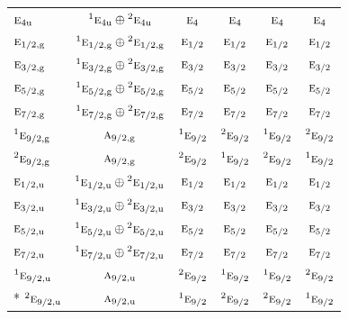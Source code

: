 \documentclass[10pt,a4paper]{article}
\numberwithin{equation}{section}
\newcommand{\irr}[1]{\text{\normalfont\scshape #1}}
\newcommand{\conjpair}[1]{{}^{#1}}
\newcommand{\ptag}[1]{\mathrm{#1}}
\begin{document}
{\begin{longtable}{@{}lccccc@{}}
$\irr{e}_{4\ptag{u}}$ & $\conjpair{1}\irr{e}_{4\ptag{u}}\oplus \conjpair{2}\irr{e}_{4\ptag{u}}$ & $\irr{e}_{4}$ & $\irr{e}_{4}$ & $\irr{e}_{4}$ & $\irr{e}_{4}$\\
$\irr{e}_{1/2,\ptag{g}}$ & $\conjpair{1}\irr{e}_{1/2,\ptag{g}}\oplus \conjpair{2}\irr{e}_{1/2,\ptag{g}}$ & $\irr{e}_{1/2}$ & $\irr{e}_{1/2}$ & $\irr{e}_{1/2}$ & $\irr{e}_{1/2}$\\
$\irr{e}_{3/2,\ptag{g}}$ & $\conjpair{1}\irr{e}_{3/2,\ptag{g}}\oplus \conjpair{2}\irr{e}_{3/2,\ptag{g}}$ & $\irr{e}_{3/2}$ & $\irr{e}_{3/2}$ & $\irr{e}_{3/2}$ & $\irr{e}_{3/2}$\\
$\irr{e}_{5/2,\ptag{g}}$ & $\conjpair{1}\irr{e}_{5/2,\ptag{g}}\oplus \conjpair{2}\irr{e}_{5/2,\ptag{g}}$ & $\irr{e}_{5/2}$ & $\irr{e}_{5/2}$ & $\irr{e}_{5/2}$ & $\irr{e}_{5/2}$\\
$\irr{e}_{7/2,\ptag{g}}$ & $\conjpair{1}\irr{e}_{7/2,\ptag{g}}\oplus \conjpair{2}\irr{e}_{7/2,\ptag{g}}$ & $\irr{e}_{7/2}$ & $\irr{e}_{7/2}$ & $\irr{e}_{7/2}$ & $\irr{e}_{7/2}$\\
$\conjpair{1}\irr{e}_{9/2,\ptag{g}}$ & $\irr{a}_{9/2,\ptag{g}}$ & $\conjpair{1}\irr{e}_{9/2}$ & $\conjpair{2}\irr{e}_{9/2}$ & $\conjpair{1}\irr{e}_{9/2}$ & $\conjpair{2}\irr{e}_{9/2}$\\
$\conjpair{2}\irr{e}_{9/2,\ptag{g}}$ & $\irr{a}_{9/2,\ptag{g}}$ & $\conjpair{2}\irr{e}_{9/2}$ & $\conjpair{1}\irr{e}_{9/2}$ & $\conjpair{2}\irr{e}_{9/2}$ & $\conjpair{1}\irr{e}_{9/2}$\\
$\irr{e}_{1/2,\ptag{u}}$ & $\conjpair{1}\irr{e}_{1/2,\ptag{u}}\oplus \conjpair{2}\irr{e}_{1/2,\ptag{u}}$ & $\irr{e}_{1/2}$ & $\irr{e}_{1/2}$ & $\irr{e}_{1/2}$ & $\irr{e}_{1/2}$\\
$\irr{e}_{3/2,\ptag{u}}$ & $\conjpair{1}\irr{e}_{3/2,\ptag{u}}\oplus \conjpair{2}\irr{e}_{3/2,\ptag{u}}$ & $\irr{e}_{3/2}$ & $\irr{e}_{3/2}$ & $\irr{e}_{3/2}$ & $\irr{e}_{3/2}$\\
$\irr{e}_{5/2,\ptag{u}}$ & $\conjpair{1}\irr{e}_{5/2,\ptag{u}}\oplus \conjpair{2}\irr{e}_{5/2,\ptag{u}}$ & $\irr{e}_{5/2}$ & $\irr{e}_{5/2}$ & $\irr{e}_{5/2}$ & $\irr{e}_{5/2}$\\
$\irr{e}_{7/2,\ptag{u}}$ & $\conjpair{1}\irr{e}_{7/2,\ptag{u}}\oplus \conjpair{2}\irr{e}_{7/2,\ptag{u}}$ & $\irr{e}_{7/2}$ & $\irr{e}_{7/2}$ & $\irr{e}_{7/2}$ & $\irr{e}_{7/2}$\\
$\conjpair{1}\irr{e}_{9/2,\ptag{u}}$ & $\irr{a}_{9/2,\ptag{u}}$ & $\conjpair{2}\irr{e}_{9/2}$ & $\conjpair{1}\irr{e}_{9/2}$ & $\conjpair{1}\irr{e}_{9/2}$ & $\conjpair{2}\irr{e}_{9/2}$\\*
$\conjpair{2}\irr{e}_{9/2,\ptag{u}}$ & $\irr{a}_{9/2,\ptag{u}}$ & $\conjpair{1}\irr{e}_{9/2}$ & $\conjpair{2}\irr{e}_{9/2}$ & $\conjpair{2}\irr{e}_{9/2}$ & $\conjpair{1}\irr{e}_{9/2}$\\
\bottomrule\end{longtable}}
\end{document}
